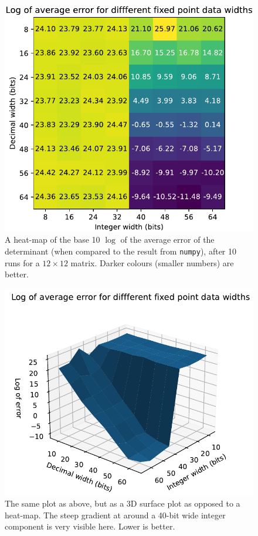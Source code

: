 \documentclass[12pt]{article}
\begin{document}
\begin{figure}[thp]
	\centering
	
	\includegraphics[width=\textwidth]{heatmap_full_det.pdf}
	
	\caption{A heat-map of the base 10 $\log$ of the average error of the determinant (when compared to the result from \lstinline|numpy|), after 10 runs for a $12 \times 12$ matrix. Darker colours (smaller numbers) are better.}
	\label{full_heat_det}
\end{figure}

\begin{figure}[thp]
	\centering
	
	\includegraphics[width=\textwidth]{sfc_plot_full_det.pdf}
	
	\caption{The same plot as above, but as a 3D surface plot as opposed to a heat-map. The steep gradient at around a 40-bit wide integer component is very visible here. Lower is better.}
	\label{full_sfc_det}
\end{figure}
\end{document}
